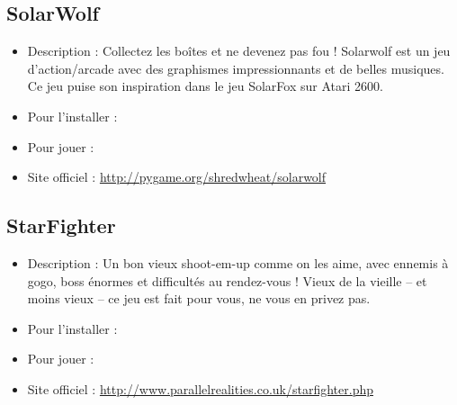\subsection{SolarWolf}
\begin{itemize}
\begingroup
{}
\item Description : Collectez les boîtes et ne devenez pas fou ! Solarwolf est un jeu d'action/arcade avec des graphismes impressionnants et de belles musiques. Ce jeu puise son inspiration dans le jeu SolarFox sur Atari 2600.{\par}
\item Pour l'installer : 
\item Pour jouer : 
\item Site officiel : \url{http://pygame.org/shredwheat/solarwolf}{\par}
\endgroup
\end{itemize}
\subsection{StarFighter}
\begin{itemize}
\begingroup
{}
\item Description : Un bon vieux shoot-em-up comme on les aime, avec ennemis à gogo, boss énormes et difficultés au rendez-vous ! Vieux de la vieille -- et moins vieux -- ce jeu est fait pour vous, ne vous en privez pas.{\par}
\endgroup
\item Pour l'installer : 
\item Pour jouer : 
\item Site officiel : \url{http://www.parallelrealities.co.uk/starfighter.php}{\par}
\end{itemize}
